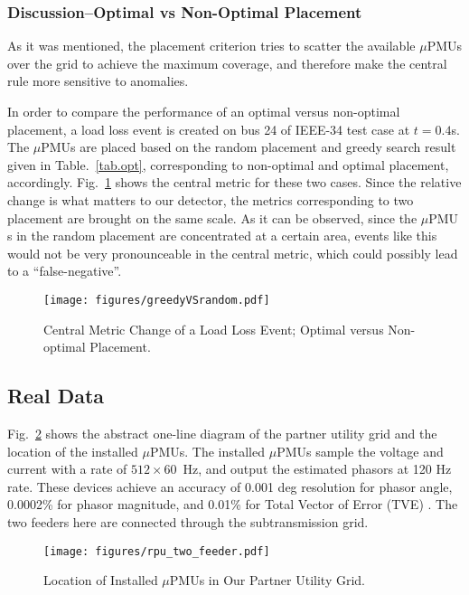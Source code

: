 \documentclass[twocolumn]{IEEEtran}
\newcommand{\mup}{\mu \text{PMU}}
\begin{document}
\subsubsection{Discussion--Optimal vs Non-Optimal Placement} 
As it was mentioned, the placement criterion tries to scatter the available $\mup$s over the grid to achieve the maximum coverage, and therefore make the central rule more sensitive to anomalies. 

In order to compare the performance of an optimal versus non-optimal placement, a load loss event is created on bus 24 of IEEE-34 test case at $t=0.4$s. The $\mup$s are placed based on the random placement and greedy search result given in Table.~\ref{tab.opt}, corresponding to non-optimal and optimal placement, accordingly. Fig.~\ref{fig.greedyVSrandom} shows the central metric for these two cases. Since the relative change is what matters to our detector, the metrics corresponding to two placement are brought on the same scale. As it can be observed, since the $\mup$s in the random placement are concentrated at a certain area, events like this would not be very pronounceable in the central metric, which could possibly lead to a ``false-negative''.
\begin{figure}[ht]
\centering 
\texttt{[image: figures/greedyVSrandom.pdf]}
\caption{Central Metric Change of a Load Loss Event; Optimal versus Non-optimal Placement.}
\label{fig.greedyVSrandom}
\end{figure}   
\subsection{Real Data}
Fig.~\ref{fig.rpu} shows the abstract one-line diagram of the partner utility grid and the location of the installed $\mup$s. The installed $\mup$s sample the voltage and current with a rate of $512 \times 60$~Hz, and output the estimated phasors at 120 Hz rate. These devices achieve an accuracy of 0.001 deg resolution for phasor angle, 0.0002\% for phasor magnitude, and 0.01\% for Total Vector of Error (TVE) \cite{upmu_site}. The two feeders here are connected through the subtransmission grid. 
\begin{figure}[ht]
\centering 
\texttt{[image: figures/rpu\_two\_feeder.pdf]}
\caption{Location of Installed $\mup$s in Our Partner Utility Grid.}
\label{fig.rpu}
\end{figure}   
\end{document}
